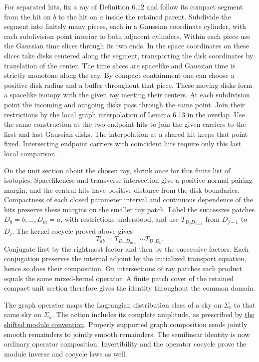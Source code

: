 \documentclass[
  english,
  11pt,
  reqno]{amsart}
\begin{document}
For separated hits, fix a ray of Definition 6.12 and follow its compact
segment from the hit on \(b\) to the hit on \(a\) inside the retained
parent. Subdivide the segment into finitely many pieces, each in a
Gaussian coordinate cylinder, with each subdivision point interior to
both adjacent cylinders. Within each piece use the Gaussian time slices
through its two ends. In the space coordinates on these slices take
disks centered along the segment, transporting the disk coordinates by
translation of the center. The time slices are spacelike and Gaussian
time is strictly monotone along the ray. By compact containment one can
choose a positive disk radius and a buffer throughout that piece. These
moving disks form a spacelike isotopy with the given ray meeting their
centers. At each subdivision point the incoming and outgoing disks pass
through the same point. Join their restrictions by the local graph
interpolation of Lemma 6.13 in the overlap. Use the same construction at
the two endpoint hits to join the given carriers to the first and last
Gaussian disks. The interpolation at a shared hit keeps that point
fixed. Intersecting endpoint carriers with coincident hits require only
this last local comparison.

On the unit section about the chosen ray, shrink once for this finite
list of isotopies. Spacelikeness and transverse intersection give a
positive normal-pairing margin, and the central hits have positive
distance from the disk boundaries. Compactness of each closed parameter
interval and continuous dependence of the hits preserve these margins on
the smaller ray patch. Label the successive patches
\(D_0=b,\ldots,D_m=a\), with restrictions understood, and use
\(T_{D_jD_{j-1}}\) from \(D_{j-1}\) to \(D_j\). The kernel cocycle
proved above gives \[
T_{ab}=T_{D_mD_{m-1}}\cdots T_{D_1D_0}.
\] Conjugate first by the rightmost factor and then by the successive
factors. Each conjugation preserves the internal adjoint by the
initialized transport equation, hence so does their composition. On
intersections of ray patches each product equals the same mixed-kernel
operator. A finite patch cover of the retained compact unit section
therefore gives the identity throughout the common domain.

The graph operator maps the Lagrangian distribution class of a sky on
\(\Sigma_b\) to that same sky on \(\Sigma_a\). The action includes its
complete amplitude, as prescribed by
\hyperref[prop:online-shifted-sky-modules]{the shifted module
convention}. Properly supported graph composition sends jointly smooth
remainders to jointly smooth remainders. The semilinear identity is now
ordinary operator composition. Invertibility and the operator cocycle
prove the module inverse and cocycle laws as well.
\end{document}
